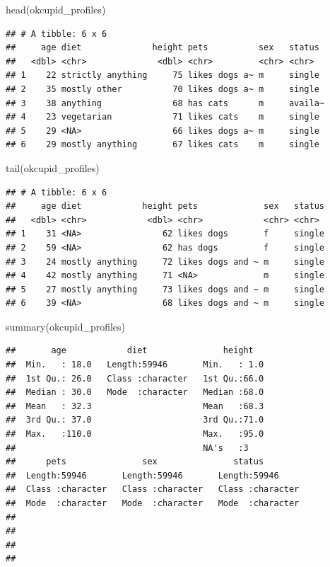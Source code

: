 \documentclass[
]{krantz}
\makeatletter
\newenvironment{Shaded}{\begin{snugshade}}{\end{snugshade}}
\newcommand{\FunctionTok}[1]{\textcolor[rgb]{0,0,0}{#1}}
\newcommand{\NormalTok}[1]{#1}
\newenvironment{kframe}{%
\medskip{}
\setlength{\fboxsep}{.8em}
 \def\at@end@of@kframe{}%
 \ifinner\ifhmode%
  \def\at@end@of@kframe{\end{minipage}}%
  \begin{minipage}{\columnwidth}%
 \fi\fi%
 \def\FrameCommand##1{\hskip\@totalleftmargin \hskip-\fboxsep
 \colorbox{shadecolor}{##1}\hskip-\fboxsep
     \hskip-\linewidth \hskip-\@totalleftmargin \hskip\columnwidth}%
 \MakeFramed {\advance\hsize-\width
   \@totalleftmargin\z@ \linewidth\hsize
   \@setminipage}}%
 {\par\unskip\endMakeFramed%
 \at@end@of@kframe}
\renewenvironment{Shaded}{\begin{kframe}}{\end{kframe}}
\makeatother
\begin{document}
\begin{Shaded}
\begin{Highlighting}[]
\FunctionTok{head}\NormalTok{(okcupid\_profiles)}
\end{Highlighting}
\end{Shaded}

\begin{verbatim}
## # A tibble: 6 x 6
##     age diet              height pets          sex   status 
##   <dbl> <chr>              <dbl> <chr>         <chr> <chr>  
## 1    22 strictly anything     75 likes dogs a~ m     single 
## 2    35 mostly other          70 likes dogs a~ m     single 
## 3    38 anything              68 has cats      m     availa~
## 4    23 vegetarian            71 likes cats    m     single 
## 5    29 <NA>                  66 likes dogs a~ m     single 
## 6    29 mostly anything       67 likes cats    m     single
\end{verbatim}

\begin{Shaded}
\begin{Highlighting}[]
\FunctionTok{tail}\NormalTok{(okcupid\_profiles)}
\end{Highlighting}
\end{Shaded}

\begin{verbatim}
## # A tibble: 6 x 6
##     age diet            height pets             sex   status
##   <dbl> <chr>            <dbl> <chr>            <chr> <chr> 
## 1    31 <NA>                62 likes dogs       f     single
## 2    59 <NA>                62 has dogs         f     single
## 3    24 mostly anything     72 likes dogs and ~ m     single
## 4    42 mostly anything     71 <NA>             m     single
## 5    27 mostly anything     73 likes dogs and ~ m     single
## 6    39 <NA>                68 likes dogs and ~ m     single
\end{verbatim}

\begin{Shaded}
\begin{Highlighting}[]
\FunctionTok{summary}\NormalTok{(okcupid\_profiles)}
\end{Highlighting}
\end{Shaded}

\begin{verbatim}
##       age            diet               height    
##  Min.   : 18.0   Length:59946       Min.   : 1.0  
##  1st Qu.: 26.0   Class :character   1st Qu.:66.0  
##  Median : 30.0   Mode  :character   Median :68.0  
##  Mean   : 32.3                      Mean   :68.3  
##  3rd Qu.: 37.0                      3rd Qu.:71.0  
##  Max.   :110.0                      Max.   :95.0  
##                                     NA's   :3     
##      pets               sex               status         
##  Length:59946       Length:59946       Length:59946      
##  Class :character   Class :character   Class :character  
##  Mode  :character   Mode  :character   Mode  :character  
##                                                          
##                                                          
##                                                          
## 
\end{verbatim}
\end{document}

